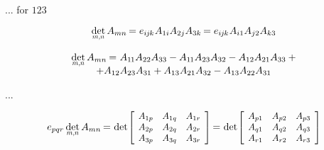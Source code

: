 \begin{otherlanguage}{russian}
... for $123$

\nopagebreak\vspace{-0.2em}\begin{equation*}
\underset{\raisebox{.12em}{\scalebox{0.7}{$m$,$n$}}}{\operatorname{det}} \, A_{mn} \hspace{-0.2ex}
= e_{i\hspace{-0.1ex}j\hspace{-0.1ex}k} \hspace{.1ex} A_{1i} A_{2j} A_{3k} \hspace{-0.2ex}
= e_{i\hspace{-0.1ex}j\hspace{-0.1ex}k} \hspace{.1ex} A_{i1} A_{j2} A_{k3}
\end{equation*}

\vspace{-0.2em}\begin{multline*}
\underset{\raisebox{.12em}{\scalebox{0.7}{$m$,$n$}}}{\operatorname{det}} \, A_{mn} \hspace{-0.15ex}
= \hspace{.1ex} A_{1\hspace{-0.12ex}1} A_{22} A_{33} - A_{1\hspace{-0.12ex}1} A_{23} A_{32}
- A_{12} A_{21} A_{33} \: + \\[-0.6em]
+ A_{12} A_{23} A_{31}
+ A_{13} A_{21} A_{32} - A_{13} A_{22} A_{31}
\end{multline*}

...

\nopagebreak\vspace{-0.1em}\begin{equation*}
e_{pqr} \hspace{.4ex} \underset{\raisebox{.12em}{\scalebox{0.7}{$m$,$n$}}}{\operatorname{det}} \, A_{mn} \hspace{-0.2ex}
= \hspace{.1ex}
\operatorname{det}\hspace{-0.25ex} \scalebox{0.92}{$\left[ \hspace{-0.15ex} \begin{array}{ccc}
A_{1p} & A_{1q} & A_{1r} \\
A_{2p} & A_{2q} & A_{2r} \\
A_{3p} & A_{3q} & A_{3r}
\end{array} \hspace{-0.1ex} \right]$} \hspace{-0.2ex}
= \hspace{.1ex}
\operatorname{det}\hspace{-0.25ex} \scalebox{0.92}{$\left[ \hspace{-0.15ex} \begin{array}{ccc}
A_{p1} & A_{p2} & A_{p3} \\
A_{q1} & A_{q2} & A_{q3} \\
A_{r1} & A_{r2} & A_{r3}
\end{array} \hspace{-0.1ex} \right]$}
\end{equation*}


\end{otherlanguage}
